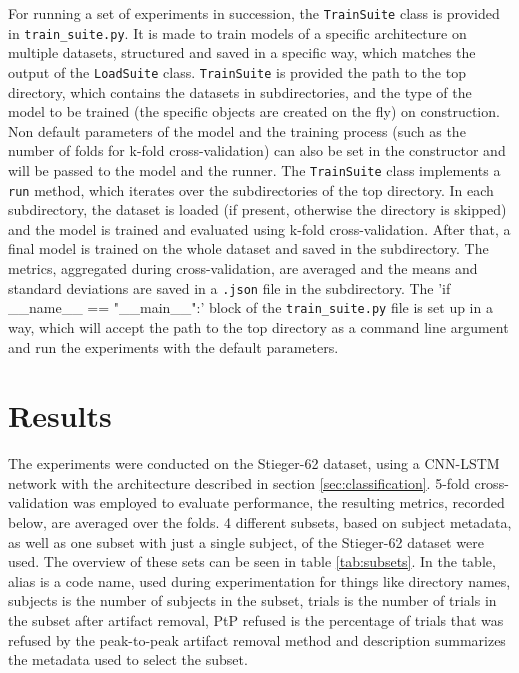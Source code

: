 \documentclass[english, he, bc, kiv, iso690alph, viewonly]{fasthesis}
\begin{document}
For running a set of experiments in succession, the \texttt{TrainSuite} class is provided in \texttt{train\_suite.py}. It is made to train models of a specific architecture on multiple datasets, structured and saved in a specific way, which matches the output of the \texttt{LoadSuite} class. \texttt{TrainSuite} is provided the path to the top directory, which contains the datasets in subdirectories, and the type of the model to be trained (the specific objects are created on the fly) on construction. Non default parameters of the model and the training process (such as the number of folds for k-fold cross-validation) can also be set in the constructor and will be passed to the model and the runner. The \texttt{TrainSuite} class implements a \texttt{run} method, which iterates over the subdirectories of the top directory. In each subdirectory, the dataset is loaded (if present, otherwise the directory is skipped) and the model is trained and evaluated using k-fold cross-validation. After that, a final model is trained on the whole dataset and saved in the subdirectory. The metrics, aggregated during cross-validation, are averaged and the means and standard deviations are saved in a \texttt{.json} file in the subdirectory. The \command'if __name__ == "__main__":' block of the \texttt{train\_suite.py} file is set up in a way, which will accept the path to the top directory as a command line argument and run the experiments with the default parameters.

\chapter{Results}
\label{chap:results}


The experiments were conducted on the Stieger-62 dataset, using a CNN-LSTM network with the architecture described in section \ref{sec:classification}. 5-fold cross-validation was employed to evaluate performance, the resulting metrics, recorded below, are averaged over the folds. 4 different subsets, based on subject metadata, as well as one subset with just a single subject, of the Stieger-62 dataset were used. The overview of these sets can be seen in table \ref{tab:subsets}. In the table, alias is a code name, used during experimentation for things like directory names, subjects is the number of subjects in the subset, trials is the number of trials in the subset after artifact removal, PtP refused is the percentage of trials that was refused by the peak-to-peak artifact removal method and description summarizes the metadata used to select the subset.
\end{document}
